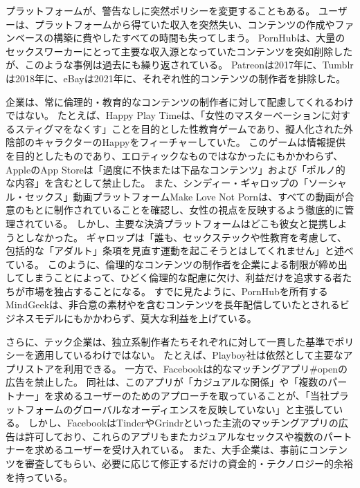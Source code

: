 \documentclass[paper=a4,book,openany]{jlreq}
\begin{document}
プラットフォームが、警告なしに突然ポリシーを変更することもある。
ユーザーは、プラットフォームから得ていた収入を突然失い、コンテンツの作成やファンベースの構築に費やしたすべての時間も失ってしまう。
PornHubは、大量のセックスワーカーにとって主要な収入源となっていたコンテンツを突如削除したが、このような事例は過去にも繰り返されている。
Patreonは2017年に、Tumblrは2018年に、eBayは2021年に、それぞれ性的コンテンツの制作者を排除した\citep{cooper17:_real_conseq_patreon_adult_conten_crack}。

企業は、常に倫理的・教育的なコンテンツの制作者に対して配慮してくれるわけではない。
たとえば、Happy Play Timeは、「女性のマスターベーションに対するスティグマをなくす」ことを目的とした性教育ゲームであり、擬人化された外陰部のキャラクターのHappyをフィーチャーしていた。
このゲームは情報提供を目的としたものであり、エロティックなものではなかったにもかかわらず、AppleのApp Storeは「過度に不快または下品なコンテンツ」および「ポルノ的な内容」を含むとして禁止した\citep{dhapolamay14:_apples_rejec_happy_playt_app}。
また、シンディー・ギャロップの「ソーシャル・セックス」動画プラットフォームMake Love Not Pornは、すべての動画が合意のもとに制作されていることを確認し、女性の視点を反映するよう徹底的に管理されている。
しかし、主要な決済プラットフォームはどこも彼女と提携しようとしなかった。
ギャロップは「誰も、セックステックや性教育を考慮して、包括的な「アダルト」条項を見直す運動を起こそうとはしてくれません」と述べている\citep{deighton20:_why_sex_start_face_uphil_paymen_battl}。
このように、倫理的なコンテンツの制作者を企業による制限が締め出してしまうことによって、ひどく倫理的な配慮に欠け、利益だけを追求する者たちが市場を独占することになる。
すでに見たように、PornHubを所有するMindGeekは、非合意の素材やを含むコンテンツを長年配信していたとされるビジネスモデルにもかかわらず、莫大な利益を上げている。

さらに、テック企業は、独立系制作者たちそれぞれに対して一貫した基準でポリシーを適用しているわけではない。
たとえば、Playboy社は依然として主要なアプリストアを利用できる。
一方で、Facebookは的なマッチングアプリ\#openの広告を禁止した。
同社は、このアプリが「カジュアルな関係」や「複数のパートナー」を求めるユーザーのためのアプローチを取っていることが、「当社プラットフォームのグローバルなオーディエンスを反映していない」と主張している\citep{kibbe20:_faceb_has_banned_ads_kink}。
しかし、FacebookはTinderやGrindrといった主流のマッチングアプリの広告は許可しており、これらのアプリもまたカジュアルなセックスや複数のパートナーを求めるユーザーを受け入れている。
また、大手企業は、事前にコンテンツを審査してもらい、必要に応じて修正するだけの資金的・テクノロジー的余裕を持っている。
\end{document}
